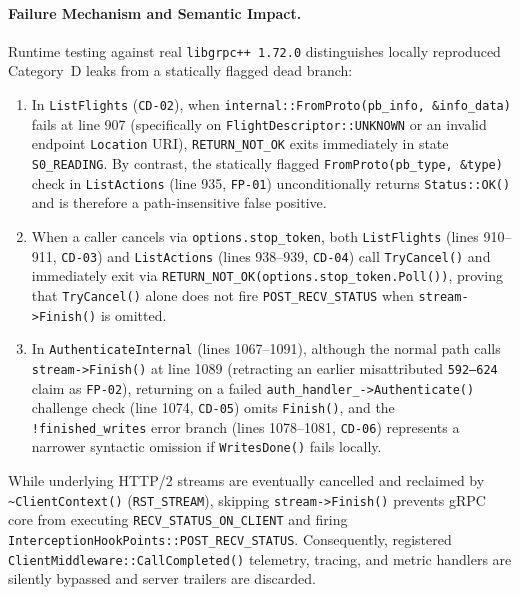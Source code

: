 \documentclass[11pt,a4paper]{article}
\begin{document}
\paragraph{Failure Mechanism and Semantic Impact.}
Runtime testing against real \texttt{libgrpc++ 1.72.0} distinguishes locally reproduced Category~D leaks from a statically flagged dead branch:
\begin{enumerate}
    \item In \texttt{ListFlights} (\texttt{CD-02}), when \texttt{internal::FromProto(pb\_info, \&info\_data)} fails at line 907 (specifically on \texttt{FlightDescriptor::UNKNOWN} or an invalid endpoint \texttt{Location} URI), \texttt{RETURN\_NOT\_OK} exits immediately in state \texttt{S0\_READING}. By contrast, the statically flagged \texttt{FromProto(pb\_type, \&type)} check in \texttt{ListActions} (line 935, \texttt{FP-01}) unconditionally returns \texttt{Status::OK()} and is therefore a path-insensitive false positive.
    \item When a caller cancels via \texttt{options.stop\_token}, both \texttt{ListFlights} (lines 910--911, \texttt{CD-03}) and \texttt{ListActions} (lines 938--939, \texttt{CD-04}) call \texttt{TryCancel()} and immediately exit via \texttt{RETURN\_NOT\_OK(options.stop\_token.Poll())}, proving that \texttt{TryCancel()} alone does not fire \texttt{POST\_RECV\_STATUS} when \texttt{stream->Finish()} is omitted.
    \item In \texttt{AuthenticateInternal} (lines 1067--1091), although the normal path calls \texttt{stream->Finish()} at line 1089 (retracting an earlier misattributed \texttt{592--624} claim as \texttt{FP-02}), returning on a failed \texttt{auth\_handler\_->Authenticate()} challenge check (line 1074, \texttt{CD-05}) omits \texttt{Finish()}, and the \texttt{!finished\_writes} error branch (lines 1078--1081, \texttt{CD-06}) represents a narrower syntactic omission if \texttt{WritesDone()} fails locally.
\end{enumerate}
While underlying HTTP/2 streams are eventually cancelled and reclaimed by \texttt{\~{}ClientContext()} (\texttt{RST\_STREAM}), skipping \texttt{stream->Finish()} prevents gRPC core from executing \texttt{RECV\_STATUS\_ON\_CLIENT} and firing \texttt{InterceptionHookPoints::POST\_RECV\_STATUS}. Consequently, registered \texttt{ClientMiddleware::CallCompleted()} telemetry, tracing, and metric handlers are silently bypassed and server trailers are discarded.
\end{document}

